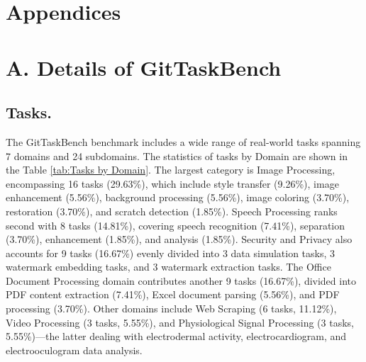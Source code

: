 \appendix
\section*{Appendices}
\section*{A. Details of GitTaskBench}\label{appendix:gittaskbench}

\subsection*{Tasks.}
The GitTaskBench benchmark includes a wide range of real-world tasks spanning 7 domains and 24 subdomains. The statistics of tasks by Domain are shown in the Table \ref{tab:Tasks by Domain}.
The largest category is Image Processing, encompassing 16 tasks (29.63\%), which include style transfer (9.26\%), image enhancement (5.56\%), background processing (5.56\%), image coloring (3.70\%), restoration (3.70\%), and scratch detection (1.85\%). Speech Processing ranks second with 8 tasks (14.81\%), covering speech recognition (7.41\%), separation (3.70\%), enhancement (1.85\%), and analysis (1.85\%). Security and Privacy also accounts for 9 tasks (16.67\%) evenly divided into 3 data simulation tasks, 3 watermark embedding tasks, and 3 watermark extraction tasks. The Office Document Processing domain contributes another 9 tasks (16.67\%), divided into PDF content extraction (7.41\%), Excel document parsing (5.56\%), and PDF processing (3.70\%). Other domains include Web Scraping (6 tasks, 11.12\%), Video Processing (3 tasks, 5.55\%), and Physiological Signal Processing (3 tasks, 5.55\%)---the latter dealing with electrodermal activity, electrocardiogram, and electrooculogram data analysis.


